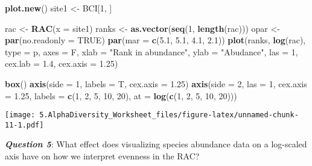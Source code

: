 \documentclass[
]{article}
\newenvironment{Shaded}{\begin{snugshade}}{\end{snugshade}}
\newcommand{\AttributeTok}[1]{\textcolor[rgb]{0.13,0.29,0.53}{#1}}
\newcommand{\ConstantTok}[1]{\textcolor[rgb]{0.56,0.35,0.01}{#1}}
\newcommand{\DecValTok}[1]{\textcolor[rgb]{0.00,0.00,0.81}{#1}}
\newcommand{\FloatTok}[1]{\textcolor[rgb]{0.00,0.00,0.81}{#1}}
\newcommand{\FunctionTok}[1]{\textcolor[rgb]{0.13,0.29,0.53}{\textbf{#1}}}
\newcommand{\NormalTok}[1]{#1}
\newcommand{\OtherTok}[1]{\textcolor[rgb]{0.56,0.35,0.01}{#1}}
\newcommand{\StringTok}[1]{\textcolor[rgb]{0.31,0.60,0.02}{#1}}
\begin{document}
\begin{Shaded}
\begin{Highlighting}[]
\FunctionTok{plot.new}\NormalTok{()}
\NormalTok{site1 }\OtherTok{\textless{}{-}}\NormalTok{ BCI[}\DecValTok{1}\NormalTok{, ]}

\NormalTok{rac }\OtherTok{\textless{}{-}} \FunctionTok{RAC}\NormalTok{(}\AttributeTok{x =}\NormalTok{ site1)}
\NormalTok{ranks }\OtherTok{\textless{}{-}} \FunctionTok{as.vector}\NormalTok{(}\FunctionTok{seq}\NormalTok{(}\DecValTok{1}\NormalTok{, }\FunctionTok{length}\NormalTok{(rac)))}
\NormalTok{opar }\OtherTok{\textless{}{-}} \FunctionTok{par}\NormalTok{(}\AttributeTok{no.readonly =} \ConstantTok{TRUE}\NormalTok{)}
\FunctionTok{par}\NormalTok{(}\AttributeTok{mar =} \FunctionTok{c}\NormalTok{(}\FloatTok{5.1}\NormalTok{, }\FloatTok{5.1}\NormalTok{, }\FloatTok{4.1}\NormalTok{, }\FloatTok{2.1}\NormalTok{))}
\FunctionTok{plot}\NormalTok{(ranks, }\FunctionTok{log}\NormalTok{(rac), }\AttributeTok{type =} \StringTok{\textquotesingle{}p\textquotesingle{}}\NormalTok{, }\AttributeTok{axes =}\NormalTok{ F,}
     \AttributeTok{xlab =} \StringTok{"Rank in abundance"}\NormalTok{, }\AttributeTok{ylab =} \StringTok{"Abudance"}\NormalTok{,}
     \AttributeTok{las =} \DecValTok{1}\NormalTok{, }\AttributeTok{cex.lab =} \FloatTok{1.4}\NormalTok{, }\AttributeTok{cex.axis =} \FloatTok{1.25}\NormalTok{)}

\FunctionTok{box}\NormalTok{()}
\FunctionTok{axis}\NormalTok{(}\AttributeTok{side =} \DecValTok{1}\NormalTok{, }\AttributeTok{labels =}\NormalTok{ T, }\AttributeTok{cex.axis =} \FloatTok{1.25}\NormalTok{)}
\FunctionTok{axis}\NormalTok{(}\AttributeTok{side =} \DecValTok{2}\NormalTok{, }\AttributeTok{las =} \DecValTok{1}\NormalTok{, }\AttributeTok{cex.axis =} \FloatTok{1.25}\NormalTok{,}
     \AttributeTok{labels =} \FunctionTok{c}\NormalTok{(}\DecValTok{1}\NormalTok{, }\DecValTok{2}\NormalTok{, }\DecValTok{5}\NormalTok{, }\DecValTok{10}\NormalTok{, }\DecValTok{20}\NormalTok{), }\AttributeTok{at =} \FunctionTok{log}\NormalTok{(}\FunctionTok{c}\NormalTok{(}\DecValTok{1}\NormalTok{, }\DecValTok{2}\NormalTok{, }\DecValTok{5}\NormalTok{, }\DecValTok{10}\NormalTok{, }\DecValTok{20}\NormalTok{)))}
\end{Highlighting}
\end{Shaded}

\texttt{[image: 5.AlphaDiversity\_Worksheet\_files/figure-latex/unnamed-chunk-11-1.pdf]}

\textbf{\emph{Question 5}}: What effect does visualizing species
abundance data on a log-scaled axis have on how we interpret evenness in
the RAC?
\end{document}
